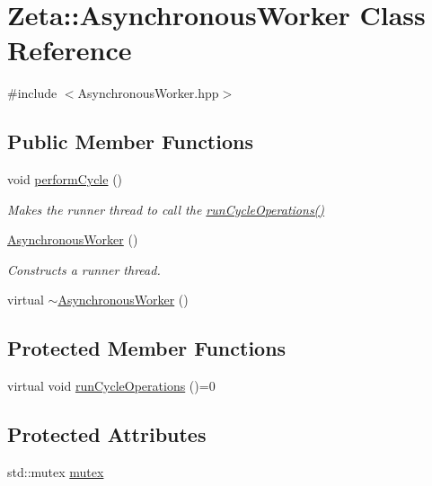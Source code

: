 \hypertarget{classZeta_1_1AsynchronousWorker}{\section{Zeta\+:\+:Asynchronous\+Worker Class Reference}
\label{classZeta_1_1AsynchronousWorker}
}


{\ttfamily \#include $<$Asynchronous\+Worker.\+hpp$>$}

\subsection*{Public Member Functions}
\begin{DoxyCompactItemize}
\item 
void \hyperlink{classZeta_1_1AsynchronousWorker_a7e5d9fb9919bc9eaf90c27c3db4f3b01}{perform\+Cycle} ()
\begin{DoxyCompactList}\small\item\em Makes the runner thread to call the \hyperlink{classZeta_1_1AsynchronousWorker_a68dbe522e2718cffa436df2f1999369e}{run\+Cycle\+Operations()} \end{DoxyCompactList}\item 
\hyperlink{classZeta_1_1AsynchronousWorker_aabcc75dc05b5525620fdaf474d70dfb3}{Asynchronous\+Worker} ()
\begin{DoxyCompactList}\small\item\em Constructs a runner thread. \end{DoxyCompactList}\item 
virtual \hyperlink{classZeta_1_1AsynchronousWorker_a638b21020fa75875c04b2e98e3762944}{$\sim$\+Asynchronous\+Worker} ()
\end{DoxyCompactItemize}
\subsection*{Protected Member Functions}
\begin{DoxyCompactItemize}
\item 
virtual void \hyperlink{classZeta_1_1AsynchronousWorker_a68dbe522e2718cffa436df2f1999369e}{run\+Cycle\+Operations} ()=0
\end{DoxyCompactItemize}
\subsection*{Protected Attributes}
\begin{DoxyCompactItemize}
\item 
std\+::mutex \hyperlink{classZeta_1_1AsynchronousWorker_ae0ae2b7e721ff8c47bb67665523d9876}{mutex}
\end{DoxyCompactItemize}
